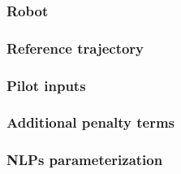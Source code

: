 \subsubsection{Robot}

\subsubsection{Reference trajectory}

\subsubsection{Pilot inputs}

\subsubsection{Additional penalty terms}

\subsubsection{NLPs parameterization}

